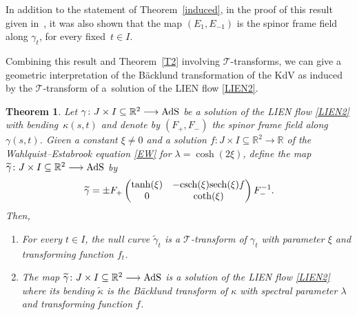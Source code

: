 \documentclass[10pt,a4paper]{amsart}
\numberwithin{equation}{section}
\newtheorem{Theorem}{Theorem}[section]
\def\bending{\kappa}
\def\R{\mathbb{R}}
\def\AdS{{\rm AdS}}
\def\sech{{\rm sech}}
\def\csch{{\rm csch}}
\begin{document}
\begin{Remark}\label{new}
	In addition to the statement of Theorem~\ref{induced}, in the proof of this result given in~\cite{MP}, it was also shown that the map $(E_1,E_{-1})$ is the spinor frame field along $\gamma_t$, for every fixed~${t\in I}$.
\end{Remark}

Combining this result and Theorem~\ref{T2} involving $\mathcal{T}$-transforms, we can give a geometric interpretation of the B\"{a}cklund transformation of the KdV as induced by the $\mathcal{T}$-transform of a~solution of the LIEN flow \eqref{LIEN2}.


\begin{Theorem}\label{T4} Let $\gamma\colon J\times I\subseteq\R^2\longrightarrow\AdS$ be a solution of the LIEN flow \eqref{LIEN2} with bending~$\bending(s,t)$ and denote by $(F_+,F_-)$ the spinor frame field along $\gamma(s,t)$. Given a constant $\xi\neq0$ and a solution $f\colon J\times I\subseteq\R^2\longrightarrow\R$ of the Wahlquist--Estabrook equation \eqref{EW} for $\lambda=\cosh(2\xi)$, define the map $\widetilde{\gamma}\colon J\times I\subseteq\R^2\longrightarrow\AdS$ by
	\begin{equation}\label{TLIEN}
		\widetilde{\gamma}=\pm F_+\begin{pmatrix} \tanh(\xi) & -\csch(\xi)\sech(\xi)f \\ 0 & \coth(\xi) \end{pmatrix} F_-^{-1}.
	\end{equation}
	Then,
	\begin{enumerate}\itemsep=0pt
		\item[$1.$] For every $t\in I$, the null curve $\widetilde{\gamma}_t$ is a $\mathcal{T}$-transform of $\gamma_t$ with parameter $\xi$ and transforming function $f_t$.
		\item[$2.$] The map $\widetilde{\gamma}\colon J\times I\subseteq\R^2\longrightarrow\AdS$ is a solution of the LIEN flow \eqref{LIEN2} where its bending $\widetilde{\bending}$ is the B\"{a}cklund transform of $\bending$ with spectral parameter $\lambda$ and transforming function $f$.
	\end{enumerate}
\end{Theorem}
\end{document}
